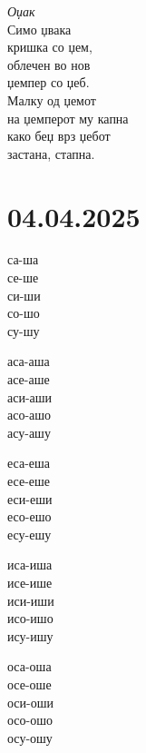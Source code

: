 \documentclass[a5paper,12pt]{article}
\newenvironment{song}{%
  \begin{tcolorbox}[colback=warmredbg,colframe=warmred,title={\textbf{Песничка}},fonttitle=\bfseries]
}{%
  \end{tcolorbox}
}
\begin{document}
\begin{song}
  \textsl{Оџак}\\

Симо џвака\\ 
кришка со џем,\\ 
облечен во нов\\
џемпер со џеб.\\


Малку од џемот\\
на џемперот му капна\\
како беџ врз џебот\\
застана, стапна.
\end{song}

\section{04.04.2025}
\noindent
\begin{minipage}[t]{0.3\textwidth}
  са-ша\\ се-ше\\ си-ши\\ со-шо\\ су-шу
\end{minipage}
\hfill
\begin{minipage}[t]{0.3\textwidth}
  аса-аша\\ асе-аше\\ аси-аши\\ асо-ашо\\ асу-ашу
\end{minipage}
\hfill
\begin{minipage}[t]{0.3\textwidth}
  еса-еша\\ есе-еше\\ еси-еши\\ есо-ешо\\ есу-ешу
\end{minipage}

\vspace{1cm}

\noindent
\begin{minipage}[t]{0.45\textwidth}
иса-иша\\ исе-ише\\ иси-иши\\ исо-ишо\\ ису-ишу
\end{minipage}
\hfill
\begin{minipage}[t]{0.45\textwidth}
оса-оша\\ осе-оше\\ оси-оши\\ осо-ошо\\ осу-ошу
\end{minipage}
\end{document}
